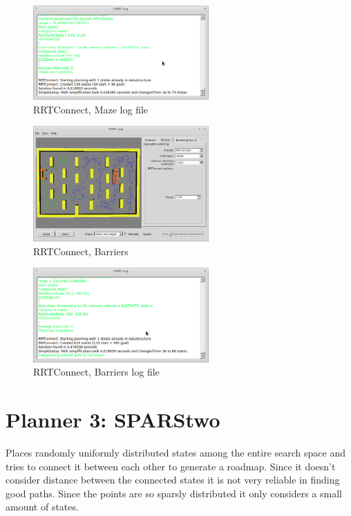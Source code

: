 \documentclass[a4paper]{article}
\begin{document}
\begin{figure}[H]
     \centering
     \includegraphics[width=0.6\textwidth]{rrtconnect_maze_log.png}
     \caption{RRTConnect, Maze log file}
     \label{signals}
\end{figure}

\begin{figure}[H]
     \centering
     \includegraphics[width=0.6\textwidth]{rrtconnect_barrier.png}
     \caption{RRTConnect, Barriers}
     \label{signals}
\end{figure}

\begin{figure}[H]
     \centering
     \includegraphics[width=0.6\textwidth]{rrtconnect_barrier_log.png}
     \caption{RRTConnect, Barriers log file}
     \label{signals}
\end{figure}

\section*{Planner 3: SPARStwo}
Places randomly uniformly distributed states among the entire search space and tries to connect it between each other to generate a roadmap. Since it doesn't consider distance between the connected states it is not very reliable in finding good paths. Since the points are so sparsly distributed it only considers a small amount of states.
\end{document}
